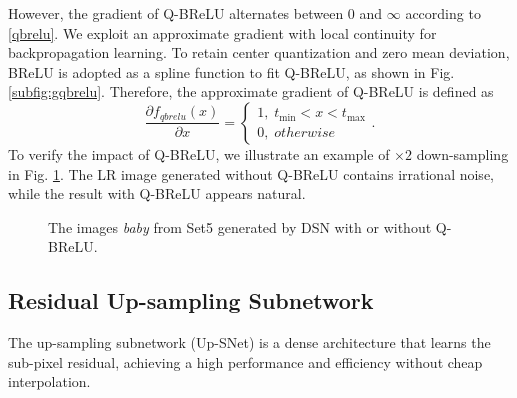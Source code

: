 \documentclass[runningheads]{llncs}
\begin{document}
However, the gradient of Q-BReLU alternates between 0 and $\infty$ according to \eqref{qbrelu}. We exploit an approximate gradient with local continuity for backpropagation learning. To retain center quantization and zero mean deviation, BReLU is adopted as a spline function to fit Q-BReLU, as shown in Fig. \ref{subfig:gqbrelu}.
Therefore, the approximate gradient of Q-BReLU is defined as
\begin{equation}\label{gqbrelu}
\frac{{\partial {f_{qbrelu}}\left( x \right)}}{{\partial x}} = \left\{ \begin{array}{l}
1,\;{{t}_{\min }} < x < {{t}_{\max }}\\
0,\;otherwise
\end{array} \right..
\end{equation}
To verify the impact of Q-BReLU, we illustrate an example of $\times2$ down-sampling in Fig. \ref{fig:showqbrelu}. The LR image generated without Q-BReLU contains irrational noise, while the result with Q-BReLU appears natural.
\begin{figure}[th]
\center
{}
\caption{The images \emph{baby} from Set5 \cite{set5} generated by DSN with or without Q-BReLU.}
\label{fig:showqbrelu}
\end{figure}

\subsection{Residual Up-sampling Subnetwork}
 The up-sampling subnetwork (Up-SNet) is a dense architecture that learns the sub-pixel residual, achieving a high performance and efficiency without cheap interpolation.
\end{document}
